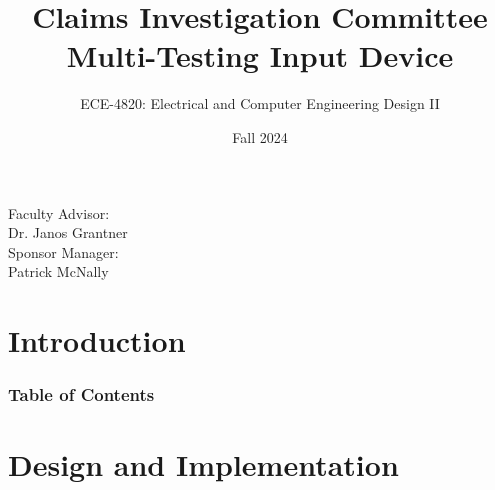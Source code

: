\documentclass[8pt,compress]{beamer}
\title{Claims Investigation Committee Multi-Testing Input Device}
\subtitle{ECE-4820: Electrical and Computer Engineering Design II}
\author[Garza, Baker, Sah]{Dylan-Matthew Garza \and Daniel Baker \and Rohullah Sah \and}
\institute[VFU] %
{
      Department of Electrical and Computer Engineering\\
      Western Michigan University
      \and
      ZF Group\\
      Auburn Hills, MI
}
\date{Fall 2024}
\begin{document}
\begin{frame}[plain]
  \titlepage
  \tiny
  \begin{multicols}{2}
      Faculty Advisor:\\
      Dr. Janos Grantner\hfill\\
    Sponsor Manager:\\
    Patrick McNally
  \end{multicols}
\end{frame}

\section{Introduction}
\begin{frame}
  \frametitle{Table of Contents}
  \tableofcontents
\end{frame}

\section{Design and Implementation}

\end{document}
